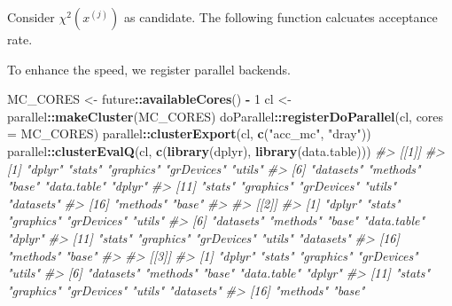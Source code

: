 \documentclass[]{book}
\newenvironment{Shaded}{\begin{snugshade}}{\end{snugshade}}
\newcommand{\CommentTok}[1]{\textcolor[rgb]{0.56,0.35,0.01}{\textit{#1}}}
\newcommand{\ControlFlowTok}[1]{\textcolor[rgb]{0.13,0.29,0.53}{\textbf{#1}}}
\newcommand{\DataTypeTok}[1]{\textcolor[rgb]{0.13,0.29,0.53}{#1}}
\newcommand{\DecValTok}[1]{\textcolor[rgb]{0.00,0.00,0.81}{#1}}
\newcommand{\KeywordTok}[1]{\textcolor[rgb]{0.13,0.29,0.53}{\textbf{#1}}}
\newcommand{\NormalTok}[1]{#1}
\newcommand{\OperatorTok}[1]{\textcolor[rgb]{0.81,0.36,0.00}{\textbf{#1}}}
\newcommand{\StringTok}[1]{\textcolor[rgb]{0.31,0.60,0.02}{#1}}
\theoremstyle{definition}
\theoremstyle{definition}
\theoremstyle{definition}
\theoremstyle{remark}
\begin{document}
Consider \(\chi^2(x^{(j)})\) as candidate. The following function calcuates acceptance rate.

\begin{Shaded}
\end{Shaded}

To enhance the speed, we register parallel backends.

\begin{Shaded}
\begin{Highlighting}[]
\NormalTok{MC_CORES <-}\StringTok{ }\NormalTok{future}\OperatorTok{::}\KeywordTok{availableCores}\NormalTok{() }\OperatorTok{-}\StringTok{ }\DecValTok{1}
\NormalTok{cl <-}\StringTok{ }\NormalTok{parallel}\OperatorTok{::}\KeywordTok{makeCluster}\NormalTok{(MC_CORES)}
\NormalTok{doParallel}\OperatorTok{::}\KeywordTok{registerDoParallel}\NormalTok{(cl, }\DataTypeTok{cores =}\NormalTok{ MC_CORES)}
\NormalTok{parallel}\OperatorTok{::}\KeywordTok{clusterExport}\NormalTok{(cl, }\KeywordTok{c}\NormalTok{(}\StringTok{"acc_mc"}\NormalTok{, }\StringTok{"dray"}\NormalTok{))}
\NormalTok{parallel}\OperatorTok{::}\KeywordTok{clusterEvalQ}\NormalTok{(cl, }\KeywordTok{c}\NormalTok{(}\KeywordTok{library}\NormalTok{(dplyr), }\KeywordTok{library}\NormalTok{(data.table)))}
\CommentTok{#> [[1]]}
\CommentTok{#>  [1] "dplyr"      "stats"      "graphics"   "grDevices"  "utils"     }
\CommentTok{#>  [6] "datasets"   "methods"    "base"       "data.table" "dplyr"     }
\CommentTok{#> [11] "stats"      "graphics"   "grDevices"  "utils"      "datasets"  }
\CommentTok{#> [16] "methods"    "base"      }
\CommentTok{#> }
\CommentTok{#> [[2]]}
\CommentTok{#>  [1] "dplyr"      "stats"      "graphics"   "grDevices"  "utils"     }
\CommentTok{#>  [6] "datasets"   "methods"    "base"       "data.table" "dplyr"     }
\CommentTok{#> [11] "stats"      "graphics"   "grDevices"  "utils"      "datasets"  }
\CommentTok{#> [16] "methods"    "base"      }
\CommentTok{#> }
\CommentTok{#> [[3]]}
\CommentTok{#>  [1] "dplyr"      "stats"      "graphics"   "grDevices"  "utils"     }
\CommentTok{#>  [6] "datasets"   "methods"    "base"       "data.table" "dplyr"     }
\CommentTok{#> [11] "stats"      "graphics"   "grDevices"  "utils"      "datasets"  }
\CommentTok{#> [16] "methods"    "base"}
\end{Highlighting}
\end{Shaded}
\end{document}

